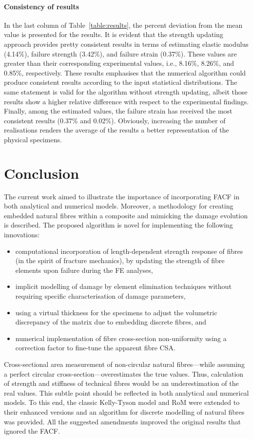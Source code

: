 	\paragraph{Consistency of results} In the last column of Table~\ref{table:results}, the percent deviation from the mean value is presented for the results. It is evident that the strength updating approach provides pretty consistent results in terms of estimating elastic modulus (4.14\%), failure strength (3.42\%), and failure strain (0.37\%). These values are greater than their corresponding experimental values, i.e., 8.16\%, 8.26\%, and 0.85\%, respectively. These results emphasises that the numerical algorithm could produce consistent results according to the input statistical distributions. The same statement is valid for the algorithm without strength updating, albeit those results show a higher relative difference with respect to the experimental findings. Finally, among the estimated values, the failure strain has received the most consistent results (0.37\% and 0.02\%). Obviously, increasing the number of realisations renders the average of the results a better representation of the physical specimens.
	


\section{Conclusion}
	The current work aimed to illustrate the importance of incorporating FACF in both analytical and numerical models. Moreover, a methodology for creating embedded natural fibres within a composite and mimicking the damage evolution is described. The proposed algorithm is novel for implementing the following innovations:
	\begin{itemize}
	\item computational incorporation of length-dependent strength response of fibres (in the spirit of fracture mechanics), by updating the strength of fibre elements upon failure during the FE analyses,
	\item implicit modelling of damage by element elimination techniques without requiring specific characterisation of damage parameters,
	\item using a virtual thickness for the specimens to adjust the volumetric discrepancy of the matrix due to embedding discrete fibres, and
	\item numerical implementation of fibre cross-section non-uniformity using a correction factor to fine-tune the apparent fibre CSA.
	\end{itemize}
	Cross-sectional area measurement of non-circular natural fibres---while assuming a perfect circular cross-section---overestimates the true values. Thus, calculation of strength and stiffness of technical fibres would be an underestimation of the real values. This subtle point should be reflected in both analytical and numerical models. To this end, the classic Kelly-Tyson model and RoM were extended to their enhanced versions and an algorithm for discrete modelling of natural fibres was provided. All the suggested amendments improved the original results that ignored the FACF. 
	
